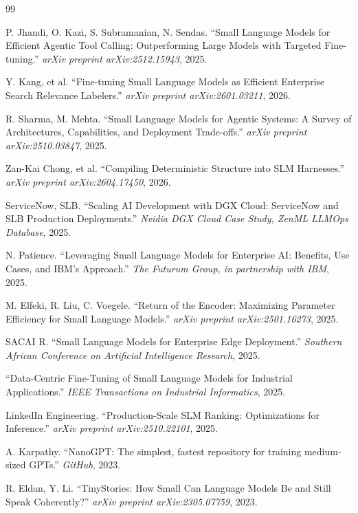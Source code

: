 \documentclass[11pt]{article}
\begin{document}

\begin{thebibliography}{99}

 P. Jhandi, O. Kazi, S. Subramanian, N. Sendas.
``Small Language Models for Efficient Agentic Tool Calling: Outperforming
Large Models with Targeted Fine-tuning.'' \emph{arXiv preprint
arXiv:2512.15943}, 2025.

 Y. Kang, et al. ``Fine-tuning Small Language
Models as Efficient Enterprise Search Relevance Labelers.'' \emph{arXiv
preprint arXiv:2601.03211}, 2026.

 R. Sharma, M. Mehta. ``Small Language Models for
Agentic Systems: A Survey of Architectures, Capabilities, and Deployment
Trade-offs.'' \emph{arXiv preprint arXiv:2510.03847}, 2025.

 Zan-Kai Chong, et al. ``Compiling Deterministic
Structure into SLM Harnesses.'' \emph{arXiv preprint arXiv:2604.17450}, 2026.

 ServiceNow, SLB. ``Scaling AI Development with
DGX Cloud: ServiceNow and SLB Production Deployments.'' \emph{Nvidia DGX
Cloud Case Study, ZenML LLMOps Database}, 2025.

 N. Patience. ``Leveraging Small Language Models
for Enterprise AI: Benefits, Use Cases, and IBM's Approach.'' \emph{The
Futurum Group, in partnership with IBM}, 2025.

 M. Elfeki, R. Liu, C. Voegele. ``Return of the
Encoder: Maximizing Parameter Efficiency for Small Language Models.''
\emph{arXiv preprint arXiv:2501.16273}, 2025.

 SACAI R. ``Small Language Models for Enterprise
Edge Deployment.'' \emph{Southern African Conference on Artificial
Intelligence Research}, 2025.

 ``Data-Centric Fine-Tuning of Small
Language Models for Industrial Applications.'' \emph{IEEE Transactions on
Industrial Informatics}, 2025.

 LinkedIn Engineering. ``Production-Scale SLM
Ranking: Optimizations for Inference.'' \emph{arXiv preprint
arXiv:2510.22101}, 2025.

 A. Karpathy. ``NanoGPT: The simplest,
fastest repository for training medium-sized GPTs.'' \emph{GitHub}, 2023.

 R. Eldan, Y. Li. ``TinyStories: How Small
Can Language Models Be and Still Speak Coherently?'' \emph{arXiv preprint
arXiv:2305.07759}, 2023.


\end{thebibliography}
\end{document}

